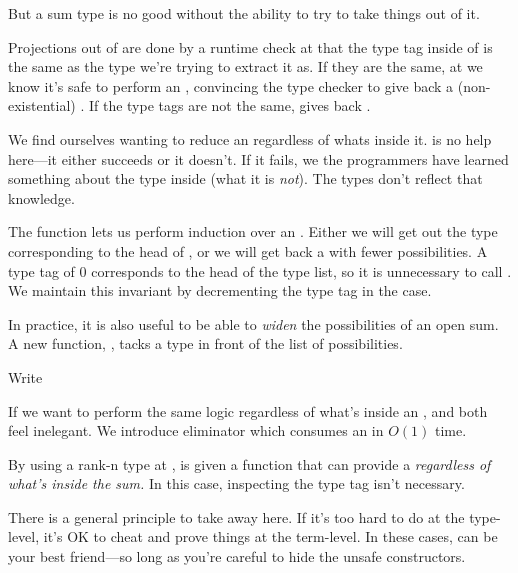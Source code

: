 \documentclass[book.tex]{subfiles}
\begin{document}
But a sum type is no good without the ability to try to take things out of it.


Projections out of  are done by a runtime check at  that the
 type tag inside of  is the same as the type we're trying to
extract it as. If they are the same, at  we know it's safe to perform an
, convincing the type checker to give back a (non-existential)
. If the type tags are not the same,  gives back .

We find ourselves wanting to reduce an  regardless of whats inside
it.  is no help here---it either succeeds or it doesn't. If it fails, we
the programmers have learned something about the type inside (what it is
\emph{not}). The types don't reflect that knowledge.


The  function lets us perform induction over an .
Either we will get out the type corresponding to the head of , or we will
get back a  with fewer possibilities. A type tag of 0 corresponds
to the head of the type list, so it is unnecessary to call . We
maintain this invariant by decrementing the type tag in the  case.

In practice, it is also useful to be able to \emph{widen} the possibilities of
an open sum. A new function, , tacks a  type in front of
the list of possibilities.

\begin{exercise}
Write 
\end{exercise}
\begin{solution}
\end{solution}

If we want to perform the same logic regardless of what's inside an
,  and  both feel inelegant. We introduce
 eliminator which consumes an  in $O(1)$ time.


By using a rank-n type at ,  is given a function that can
provide a  \emph{regardless of what's inside the sum.} In this case,
inspecting the type tag isn't necessary.

There is a general principle to take away here. If it's too hard to do at the
type-level, it's OK to cheat and prove things at the term-level. In these cases,
 can be your best friend---so long as you're careful to hide
the unsafe constructors.
\end{document}
